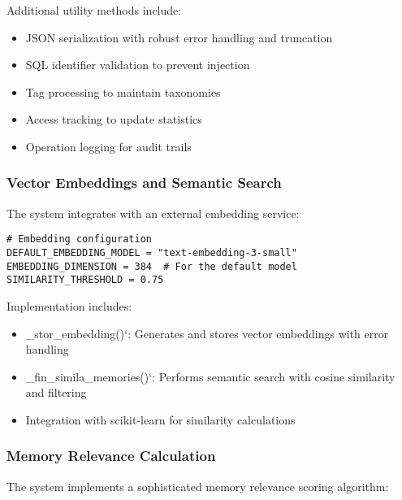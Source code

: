 \documentclass[12pt,a4paper]{article}
\begin{document}
Additional utility methods include:
\begin{itemize}
    \item JSON serialization with robust error handling and truncation
    \item SQL identifier validation to prevent injection
    \item Tag processing to maintain taxonomies
    \item Access tracking to update statistics
    \item Operation logging for audit trails
\end{itemize}

\subsubsection*{Vector Embeddings and Semantic Search}

The system integrates with an external embedding service:

\begin{pageablecode}
\begin{verbatim}
# Embedding configuration
DEFAULT_EMBEDDING_MODEL = "text-embedding-3-small"
EMBEDDING_DIMENSION = 384  # For the default model
SIMILARITY_THRESHOLD = 0.75
\end{verbatim}
\end{pageablecode}

Implementation includes:
\begin{itemize}
    \item \1\_stor\1\_embedding()`: Generates and stores vector embeddings with error handling
    \item \1\_fin\1\_simila\1\_memories()`: Performs semantic search with cosine similarity and filtering
    \item Integration with scikit-learn for similarity calculations
\end{itemize}

\subsubsection*{Memory Relevance Calculation}

The system implements a sophisticated memory relevance scoring algorithm:
\end{document}
